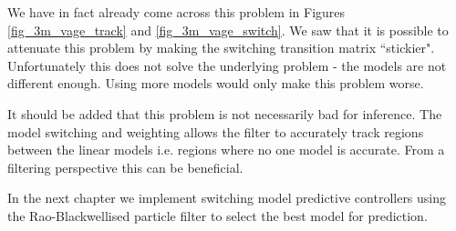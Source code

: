 We have in fact already come across this problem in Figures \ref{fig_3m_vage_track} and \ref{fig_3m_vage_switch}. We saw that it is possible to attenuate this problem by making the switching transition matrix ``stickier". Unfortunately this does not solve the underlying problem - the models are not different enough. Using more models would only make this problem worse.

It should be added that this problem is not necessarily bad for inference. The model switching and weighting allows the filter to accurately track regions between the linear models i.e. regions where no one model is accurate. From a filtering perspective this can be beneficial.

In the next chapter we implement switching model predictive controllers using the Rao-Blackwellised particle filter to select the best model for prediction.